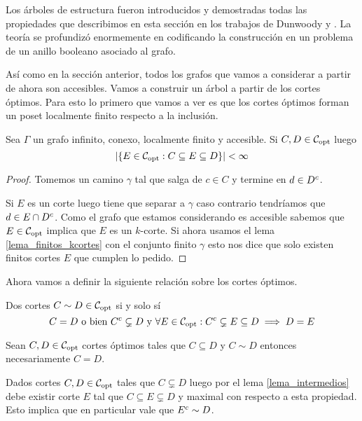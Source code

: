 \documentclass[tesis.tex]{subfiles}
\begin{document}
Los árboles de estructura fueron introducidos y demostradas todas las propiedades que describimos en esta sección en los trabajos de Dunwoody \cite{dunwoody1979accessibility} y \cite{dunwoody1982cutting}.
La teoría se profundizó enormemente en \cite{dicks1989groups} codificando la construcción en un problema de un anillo booleano asociado al grafo. 

Así como en la sección anterior, todos los grafos que vamos a considerar a partir de ahora son accesibles.
Vamos a construir un árbol a partir de los cortes óptimos.
Para esto lo primero que vamos a ver es que los cortes óptimos forman un poset localmente finito respecto a la inclusión.

\begin{lema}\label{lema_intermedios}
	Sea $\Gamma$ un grafo infinito, conexo, localmente finito y accesible.
	Si $C,D \in {\cal C}_{\text{opt}}$ luego 
	\[
	|\{ E \in {\cal C}_{\text{opt}} : C \subseteq E \subseteq D \}| < \infty
	\]
\end{lema}
\begin{proof}
	Tomemos un camino $\gamma$ tal que salga de $c \in C$ y termine en $d \in D^{c}$.
	
	Si $E$ es un corte luego tiene que separar a $\gamma$ caso contrario tendríamos que $d \in E \cap D^{c}$.
	Como el grafo que estamos considerando es accesible sabemos que $E \in {\cal C}_{\text{opt}}$ implica que $E$ es un $k$-corte.
	Si ahora usamos el lema \ref{lema_finitos_kcortes} con el conjunto finito $\gamma$ esto nos dice que solo existen finitos cortes $E$ que cumplen lo pedido.
\end{proof}


Ahora vamos a definir la siguiente relación sobre los cortes óptimos.

\begin{deff}
	Dos cortes $C \sim D \in {\cal C}_{\text{opt}}$ si y solo sí
	\[
		C = D \ \text{o bien} \ C^{c} \subsetneq D \ \text{y} \ \forall E \in {\cal C}_{\text{opt}} : C^{c} \subsetneq E \subseteq D \implies D = E
	\]
\end{deff}

\begin{obs}\label{obs_copt_igualdad}
	Sean $C,D \in {\cal C}_{\text{opt}}$ cortes óptimos tales que $C \subseteq D$ y $C \sim D$ entonces necesariamente $C = D$.
\end{obs}

\begin{obs}\label{obs_cortes_maximal}
	Dados cortes $C,D \in {\cal C}_{\text{opt}}$ tales que $C \subsetneq D$ luego por el lema \ref{lema_intermedios} debe existir corte $E$ tal que $C \subseteq E \subsetneq D$ y maximal con respecto a esta propiedad. 
	Esto implica que en particular vale que $E^{c} \sim D$.
\end{obs}
\end{document}
